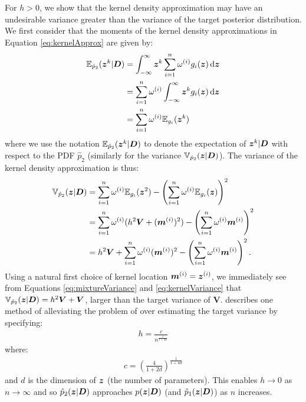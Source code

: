 For \(h > 0\), we show that the kernel density approximation may have an undesirable variance greater than the variance
of the target posterior distribution. We first consider that the moments of the kernel density approximations in
Equation \eqref{eq:kernelApprox} are given by:
\begin{align} 
\mathbb{E}_{\hat{p}_2}(\boldsymbol{z}^k | \boldsymbol{D}) 
&= \int_{-\infty}^\infty \boldsymbol{z}^k \sum_{i=1}^{n} \omega^{(i)} g_i(\boldsymbol{z}) \, \mathrm{d}\boldsymbol{z} \notag\\
&= \sum_{i=1}^{n} \omega^{(i)} \int_{-\infty}^\infty \boldsymbol{z}^k g_i(\boldsymbol{z}) \, \mathrm{d}\boldsymbol{z} \notag\\
&= \sum_{i=1}^{n} \omega^{(i)} \mathbb{E}_{g_i}(\boldsymbol{z}^k)
\end{align}
where we use the notation \(\mathbb{E}_{\hat{p}_2}(\boldsymbol{z}^k | \boldsymbol{D})\) to denote the expectation of \(\boldsymbol{z}^k | \boldsymbol{D}\) with
respect to the \gls{PDF} \(\hat{p}_2\) (similarly for the variance \(\mathbb{V}_{\hat{p}_2}(\boldsymbol{z} | \boldsymbol{D})\)). The variance of
the kernel density approximation is thus:
\begin{align} 
\mathbb{V}_{\hat{p}_2}(\boldsymbol{z} | \boldsymbol{D}) 
&= \sum_{i=1}^{n} \omega^{(i)} \mathbb{E}_{g_i}(\boldsymbol{z}^2) - \left(\sum_{i=1}^{n} \omega^{(i)} \mathbb{E}_{g_i}(\boldsymbol{z})\right)^2 \notag\\
&= \sum_{i=1}^{n} \omega^{(i)} (h^2 \boldsymbol{V} + (\boldsymbol{m}^{(i)})^2) - \left(\sum_{i=1}^{n} \omega^{(i)} \boldsymbol{m}^{(i)}\right)^2 \notag\\
&= h^2 \boldsymbol{V} + \sum_{i=1}^{n} \omega^{(i)} (\boldsymbol{m}^{(i)})^2 - \left(\sum_{i=1}^{n} \omega^{(i)} \boldsymbol{m}^{(i)}\right)^2.
\label{eq:mixtureVariance}
\end{align}
Using a natural first choice of kernel location \(\boldsymbol{m}^{(i)} = \boldsymbol{z}^{(i)}\), we immediately see from Equations
\eqref{eq:mixtureVariance} and \eqref{eq:kernelVariance} that \(\mathbb{V}_{\hat{p}_2}(\boldsymbol{z} | \boldsymbol{D})  = h^2 \boldsymbol{V} +
\boldsymbol{V}\), larger than the target variance of \(\boldsymbol{V}\). \cite{West1993A} describes one method of
alleviating the problem of over estimating the target variance by specifying:
\begin{align} 
h = \frac{c}{n^\frac{1}{1 + 4d}}
\end{align}
where:
\begin{align} 
c = \left(\frac{4}{1 + 2d}\right)^\frac{1}{1 + 4d}
\end{align}
and \(d\) is the dimension of \(\boldsymbol{z}\) (the number of parameters). This enables \(h \rightarrow 0\) as \(n
\rightarrow \infty\) and so \(\hat{p}_2(\boldsymbol{z} | \boldsymbol{D})\) approaches \(p(\boldsymbol{z} | \boldsymbol{D})\) (and \(\hat{p}_1(\boldsymbol{z} |
\boldsymbol{D})\)) as \(n\) increases.

